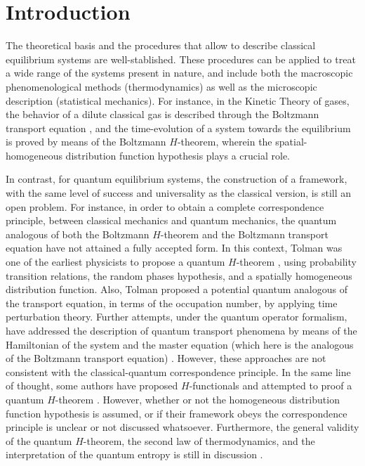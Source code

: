 \section{Introduction}

The theoretical basis and the procedures that allow to describe classical equilibrium systems
are well-stablished. These procedures can be applied to treat a wide range of the systems
present in nature, and include both the macroscopic phenomenological methods (thermodynamics)
as well as the microscopic description (statistical mechanics). For instance,
in the Kinetic Theory of gases, the behavior of a dilute classical gas
is described through the Boltzmann transport equation \cite{bib:huang},
and the time-evolution of a system towards the equilibrium is proved by
means of the Boltzmann $H$-theorem, wherein the
spatial-homogeneous distribution function hypothesis plays a crucial role.

In contrast, for quantum equilibrium systems, the construction of a framework,
with the same level of
success and universality as the classical version, is still an open problem. For instance,
in order to obtain a complete correspondence principle, between classical mechanics
and quantum mechanics, the quantum analogous of both the Boltzmann $H$-theorem
and the Boltzmann transport equation have not attained a fully accepted form.
In this context, Tolman was one of the earliest physicists to propose a quantum
$H$-theorem \cite{bib:tolman}, using probability transition relations, the random
phases hypothesis, and a spatially homogeneous distribution function.
Also, Tolman proposed a potential quantum analogous of the transport equation,
in terms of the occupation number,
by applying time perturbation theory. Further attempts, under the quantum operator
formalism, have addressed the description of quantum transport phenomena by means of the Hamiltonian
of the system and the master equation (which here is the analogous
of the Boltzmann transport equation)
\cite{bib:grabert1974,bib:wang2014,%
bib:angel2017,
bib:amato2020,bib:nicacio2015,bib:hussein2014}. However, these approaches 
are not consistent with the classical-quantum correspondence principle.
In the same line of thought, some authors have proposed $H$-functionals
and attempted to proof a
quantum $H$-theorem \cite{bib:gorban2014,bib:bennaim2017,bib:silva2010,%
bib:deroeck2006,bib:acharya2019,bib:kastner2017,bib:han2015,bib:das2018,bib:vonneumann2010}.
However, whether or not the homogeneous distribution function hypothesis is assumed, or
if their framework obeys the correspondence principle is unclear or not discussed whatsoever.
Furthermore, the general validity
of the quantum $H$-theorem, the second law of thermodynamics, and the
interpretation of the quantum entropy is still in discussion %
\cite{bib:silva2010,bib:acharya2019,bib:kastner2017,bib:han2015,bib:brown2008,%
bib:dragoljub2009,bib:vonneumann2010,%
bib:syros1999,bib:lesovik2016,
bib:lesovik2019}.


